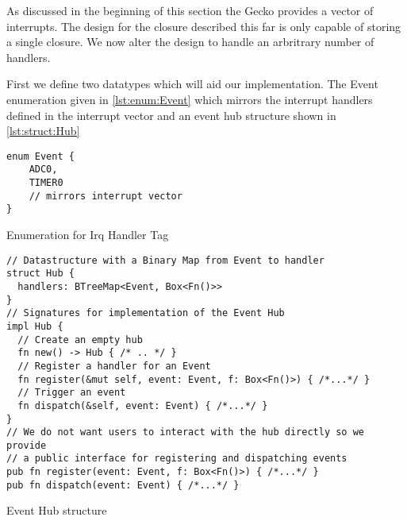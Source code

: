 As discussed in the beginning of this section the Gecko provides a vector of interrupts.
The design for the closure described this far is only capable of storing a single closure.
We now alter the design to handle an arbritrary number of handlers.

First we define two datatypes which will aid our implementation.
The Event enumeration given in \autoref{lst:enum:Event} which mirrors the interrupt handlers defined in the interrupt vector and an event hub structure shown in \autoref{lst:struct:Hub}

\begin{listing}[H]
  \begin{verbatim}
enum Event {
    ADC0,
    TIMER0
    // mirrors interrupt vector
}
  \end{verbatim}
  \caption{Enumeration for Irq Handler Tag}
  \label{lst:enum:Event}
\end{listing}

\begin{listing}[H]
  \begin{verbatim}
// Datastructure with a Binary Map from Event to handler
struct Hub {
  handlers: BTreeMap<Event, Box<Fn()>>
}
// Signatures for implementation of the Event Hub
impl Hub {
  // Create an empty hub
  fn new() -> Hub { /* .. */ }
  // Register a handler for an Event
  fn register(&mut self, event: Event, f: Box<Fn()>) { /*...*/ }
  // Trigger an event
  fn dispatch(&self, event: Event) { /*...*/ }
}
// We do not want users to interact with the hub directly so we provide
// a public interface for registering and dispatching events
pub fn register(event: Event, f: Box<Fn()>) { /*...*/ }
pub fn dispatch(event: Event) { /*...*/ }
  \end{verbatim}
  \caption{Event Hub structure}
  \label{lst:struct:Hub}
\end{listing}

